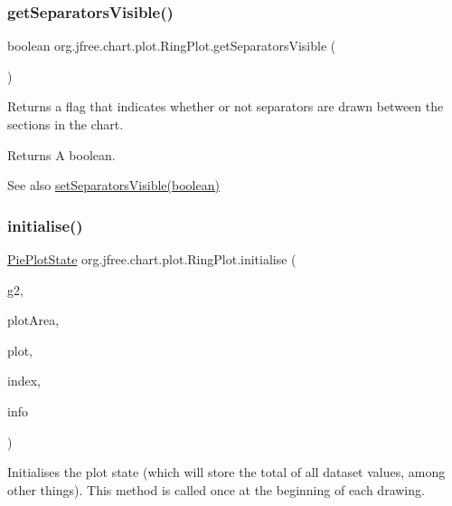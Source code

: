 \subsubsection{\texorpdfstring{get\+Separators\+Visible()}{getSeparatorsVisible()}}
{\footnotesize\ttfamily boolean org.\+jfree.\+chart.\+plot.\+Ring\+Plot.\+get\+Separators\+Visible (\begin{DoxyParamCaption}{ }\end{DoxyParamCaption})}

Returns a flag that indicates whether or not separators are drawn between the sections in the chart.

\begin{DoxyReturn}{Returns}
A boolean.
\end{DoxyReturn}
\begin{DoxySeeAlso}{See also}
\mbox{\hyperlink{classorg_1_1jfree_1_1chart_1_1plot_1_1_ring_plot_a9b60ddf9d8fc13eed9352ed8da3178e6}{set\+Separators\+Visible(boolean)}} 
\end{DoxySeeAlso}
\mbox{\label{classorg_1_1jfree_1_1chart_1_1plot_1_1_ring_plot_a4a4994c3d2497203b0b67a1885e5a689}} 
\subsubsection{\texorpdfstring{initialise()}{initialise()}}
{\footnotesize\ttfamily \mbox{\hyperlink{classorg_1_1jfree_1_1chart_1_1plot_1_1_pie_plot_state}{Pie\+Plot\+State}} org.\+jfree.\+chart.\+plot.\+Ring\+Plot.\+initialise (\begin{DoxyParamCaption}\item[{Graphics2D}]{g2,  }\item[{Rectangle2D}]{plot\+Area,  }\item[{\mbox{\hyperlink{classorg_1_1jfree_1_1chart_1_1plot_1_1_pie_plot}{Pie\+Plot}}}]{plot,  }\item[{Integer}]{index,  }\item[{\mbox{\hyperlink{classorg_1_1jfree_1_1chart_1_1plot_1_1_plot_rendering_info}{Plot\+Rendering\+Info}}}]{info }\end{DoxyParamCaption})}

Initialises the plot state (which will store the total of all dataset values, among other things). This method is called once at the beginning of each drawing.


